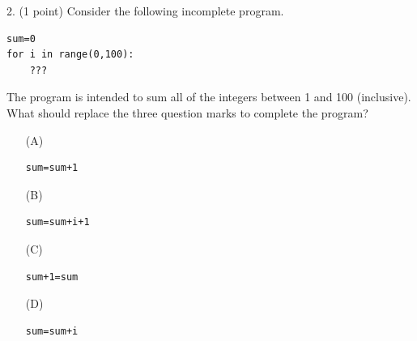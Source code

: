 \documentclass{article}
\newcounter{question}
\begin{document}
\noindent
\begin{minipage}{\textwidth}
2. (1 point)
Consider the following incomplete program.
\begin{verbatim}
sum=0
for i in range(0,100):
    ???

\end{verbatim}
The program is intended to sum all of the integers between 1 and 100 (inclusive). What should replace the three question marks to complete the program?

\begin{enumerate}
\item[(A)]
\begin{verbatim}sum=sum+1\end{verbatim}

\item[(B)]
\begin{verbatim}sum=sum+i+1 \end{verbatim}

\item[(C)]
\begin{verbatim}sum+1=sum \end{verbatim}

\item[(D)]
\begin{verbatim}sum=sum+i \end{verbatim}

\end{enumerate}
\end{minipage}
\vspace{2em}
\filbreak\vfil{}\vfilneg
\end{document}
